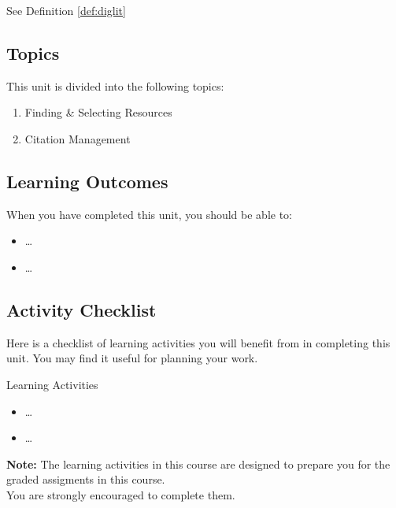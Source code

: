 \documentclass[
]{book}
\providecommand{\tightlist}{%
  \setlength{\itemsep}{0pt}\setlength{\parskip}{0pt}}
\theoremstyle{definition}
\theoremstyle{definition}
\theoremstyle{definition}
\theoremstyle{definition}
\theoremstyle{remark}
\begin{document}
See Definition \ref{def:diglit}

\hypertarget{topics-1}{%
\subsection*{Topics}\label{topics-1}}

This unit is divided into the following topics:

\begin{enumerate}
\def\labelenumi{\arabic{enumi}.}
\tightlist
\item
  Finding \& Selecting Resources
\item
  Citation Management
\end{enumerate}

\hypertarget{learning-outcomes-1}{%
\subsection*{Learning Outcomes}\label{learning-outcomes-1}}

When you have completed this unit, you should be able to:

\begin{itemize}
\tightlist
\item
  \ldots{}
\item
  \ldots{}
\end{itemize}

\hypertarget{activity-checklist-1}{%
\subsection*{Activity Checklist}\label{activity-checklist-1}}

Here is a checklist of learning activities you will benefit from in completing this unit. You may find it useful for planning your work.

\begin{reflect}
{Learning Activities}

\begin{itemize}
\tightlist
\item
  \ldots{}
\item
  \ldots{}
\end{itemize}

\textbf{Note:} The learning activities in this course are designed to prepare you for the graded assigments in this course.\\
You are strongly encouraged to complete them.
\end{reflect}
\end{document}
